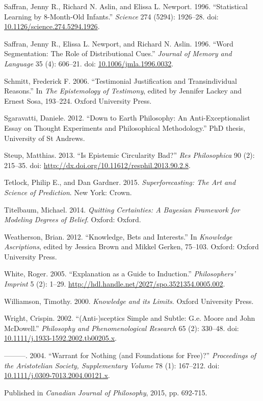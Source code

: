 \documentclass[
  11pt,
  letterpaper,
  DIV=11,
  numbers=noendperiod,
  twoside]{scrartcl}
\newlength{\cslhangindent}
\newenvironment{CSLReferences}[2] %
 {\begin{list}{}{%
  \setlength{\itemindent}{0pt}
  \setlength{\leftmargin}{0pt}
  \setlength{\parsep}{0pt}
  \ifodd #1
   \setlength{\leftmargin}{\cslhangindent}
   \setlength{\itemindent}{-1\cslhangindent}
  \fi
  \setlength{\itemsep}{#2\baselineskip}}}
 {\end{list}}
\begin{document}
\begin{CSLReferences}{1}{0}
Saffran, Jenny R., Richard N. Aslin, and Elissa L. Newport. 1996.
{``Statistical Learning by 8-Month-Old Infants.''} \emph{Science} 274
(5294): 1926--28. doi:
\href{https://doi.org/10.1126/science.274.5294.1926}{10.1126/science.274.5294.1926}.

Saffran, Jenny R., Elissa L. Newport, and Richard N. Aslin. 1996.
{``Word Segmentation: The Role of Distributional Cues.''} \emph{Journal
of Memory and Language} 35 (4): 606--21. doi:
\href{https://doi.org/10.1006/jmla.1996.0032}{10.1006/jmla.1996.0032}.

Schmitt, Frederick F. 2006. {``{T}estimonial {J}ustification and
{T}ransindividual {R}easons.''} In \emph{{T}he {E}pistemology of
{T}estimony}, edited by Jennifer Lackey and Ernest Sosa, 193--224.
{O}xford {U}niversity {P}ress.

Sgaravatti, Daniele. 2012. {``Down to Earth Philosophy: An
Anti-Exceptionalist Essay on Thought Experiments and Philosophical
Methodology.''} PhD thesis, University of St Andrews.

Steup, Matthias. 2013. {``Is Epistemic Circularity Bad?''} \emph{Res
Philosophica} 90 (2): 215--35. doi:
\url{http://dx.doi.org/10.11612/resphil.2013.90.2.8}.

Tetlock, Philip E., and Dan Gardner. 2015. \emph{Superforecasting: The
Art and Science of Prediction}. New York: Crown.

Titelbaum, Michael. 2014. \emph{Quitting Certainties: A Bayesian
Framework for Modeling Degrees of Belief}. Oxford: Oxford.

Weatherson, Brian. 2012. {``Knowledge, Bets and Interests.''} In
\emph{Knowledge Ascriptions}, edited by Jessica Brown and Mikkel Gerken,
75--103. Oxford: Oxford University Press.

White, Roger. 2005. {``Explanation as a Guide to Induction.''}
\emph{Philosophers' Imprint} 5 (2): 1--29.
\url{http://hdl.handle.net/2027/spo.3521354.0005.002}.

Williamson, Timothy. 2000. \emph{{Knowledge and its Limits}}. Oxford
University Press.

Wright, Crispin. 2002. {``(Anti-)sceptics Simple and Subtle: G.e. Moore
and John McDowell.''} \emph{Philosophy and Phenomenological Research} 65
(2): 330--48. doi:
\href{https://doi.org/10.1111/j.1933-1592.2002.tb00205.x}{10.1111/j.1933-1592.2002.tb00205.x}.

---------. 2004. {``Warrant for Nothing (and Foundations for Free)?''}
\emph{Proceedings of the Aristotelian Society, Supplementary Volume} 78
(1): 167--212. doi:
\href{https://doi.org/10.1111/j.0309-7013.2004.00121.x}{10.1111/j.0309-7013.2004.00121.x}.

\end{CSLReferences}



\noindent Published in\emph{
Canadian Journal of Philosophy}, 2015, pp. 692-715.
\end{document}
